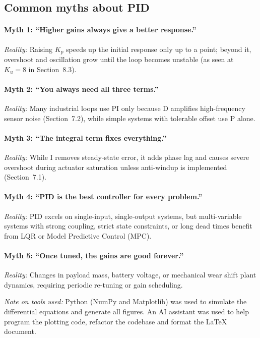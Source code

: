 \documentclass[10pt]{article}
\begin{document}
	\subsection{Common myths about PID}
	\paragraph{Myth 1: ``Higher gains always give a better response.''}
	\emph{Reality:} Raising $K_p$ speeds up the initial response only up to a point; beyond it, overshoot and oscillation grow until the loop becomes unstable (as seen at $K_u = 8$ in Section~8.3).
	
	\paragraph{Myth 2: ``You always need all three terms.''}
	\emph{Reality:} Many industrial loops use PI only because D amplifies high-frequency sensor noise (Section~7.2), while simple systems with tolerable offset use P alone.
	
	\paragraph{Myth 3: ``The integral term fixes everything.''}
	\emph{Reality:} While I removes steady-state error, it adds phase lag and causes severe overshoot during actuator saturation unless anti-windup is implemented (Section~7.1).
	
	\paragraph{Myth 4: ``PID is the best controller for every problem.''}
	\emph{Reality:} PID excels on single-input, single-output systems, but multi-variable systems with strong coupling, strict state constraints, or long dead times benefit from LQR or Model Predictive Control (MPC).
	
	\paragraph{Myth 5: ``Once tuned, the gains are good forever.''}
	\emph{Reality:} Changes in payload mass, battery voltage, or mechanical wear shift plant dynamics, requiring periodic re-tuning or gain scheduling.
	
	\medskip
	\medskip
	\medskip
	\noindent\textit{Note on tools used:} Python (NumPy and Matplotlib) was used to simulate the differential equations and generate all figures. An AI assistant was used to help program the plotting code, refactor the codebase and format the LaTeX document.
	
\end{document}
